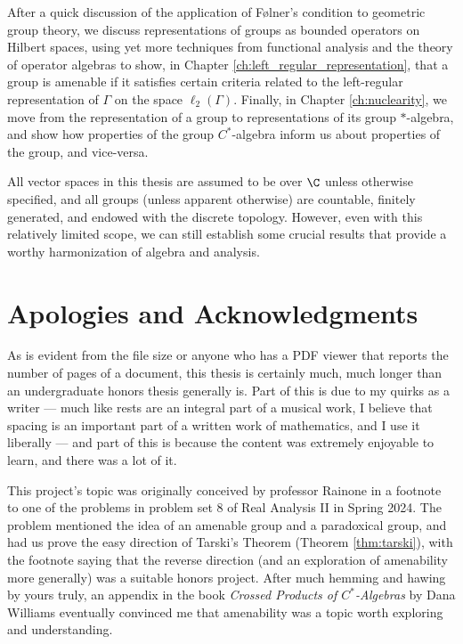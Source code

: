 \documentclass[11pt]{package2}
\begin{document}
After a quick discussion of the application of Følner's condition to geometric group theory, we discuss representations of groups as bounded operators on Hilbert spaces, using yet more techniques from functional analysis and the theory of operator algebras to show, in Chapter \ref{ch:left_regular_representation}, that a group is amenable if it satisfies certain criteria related to the left-regular representation of $\Gamma$ on the space $\ell_2\left(\Gamma\right)$. Finally, in Chapter \ref{ch:nuclearity}, we move from the representation of a group to representations of its group $\ast$-algebra, and show how properties of the group $C^{\ast}$-algebra inform us about properties of the group, and vice-versa.\newline

All vector spaces in this thesis are assumed to be over $\C$ unless otherwise specified, and all groups (unless apparent otherwise) are countable, finitely generated, and endowed with the discrete topology. However, even with this relatively limited scope, we can still establish some crucial results that provide a worthy harmonization of algebra and analysis.
\section{Apologies and Acknowledgments}%
As is evident from the file size or anyone who has a PDF viewer that reports the number of pages of a document, this thesis is certainly much, much longer than an undergraduate honors thesis generally is. Part of this is due to my quirks as a writer --- much like rests are an integral part of a musical work, I believe that spacing is an important part of a written work of mathematics, and I use it liberally --- and part of this is because the content was extremely enjoyable to learn, and there was a lot of it.\newline

This project's topic was originally conceived by professor Rainone in a footnote to one of the problems in problem set 8 of Real Analysis II in Spring 2024. The problem mentioned the idea of an amenable group and a paradoxical group, and had us prove the easy direction of Tarski's Theorem (Theorem \ref{thm:tarski}), with the footnote saying that the reverse direction (and an exploration of amenability more generally) was a suitable honors project. After much hemming and hawing by yours truly, an appendix in the book \textit{Crossed Products of $C^{\ast}$-Algebras} by Dana Williams eventually convinced me that amenability was a topic worth exploring and understanding.\newline
\end{document}
